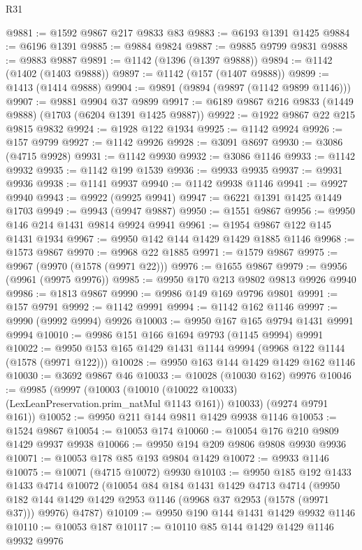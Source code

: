 \begin{lexlean}{R31}
\begin{coremodule}
@9881 := @1592 @9867 @217 @9833 @83
@9883 := @6193 @1391 @1425
@9884 := @6196 @1391
@9885 := @9884 @9824
@9887 := @9885 @9799 @9831
@9888 := @9883 @9887
@9891 := @1142 (@1396 (@1397 @9888))
@9894 := @1142 (@1402 (@1403 @9888))
@9897 := @1142 (@157 (@1407 @9888))
@9899 := @1413 (@1414 @9888)
@9904 := @9891 (@9894 (@9897 (@1142 @9899 @1146)))
@9907 := @9881 @9904 @37 @9899
@9917 := @6189 @9867 @216 @9833 (@1449 @9888) (@1703 (@6204 @1391 @1425 @9887))
@9922 := @1922 @9867 @22 @215 @9815 @9832
@9924 := @1928 @122 @1934
@9925 := @1142 @9924
@9926 := @157 @9799
@9927 := @1142 @9926
@9928 := @3091 @8697
@9930 := @3086 (@4715 @9928)
@9931 := @1142 @9930
@9932 := @3086 @1146
@9933 := @1142 @9932
@9935 := @1142 @199 @1539
@9936 := @9933 @9935
@9937 := @9931 @9936
@9938 := @1141 @9937
@9940 := @1142 @9938 @1146
@9941 := @9927 @9940
@9943 := @9922 (@9925 @9941)
@9947 := @6221 @1391 @1425 @1449 @1703
@9949 := @9943 (@9947 @9887)
@9950 := @1551 @9867
@9956 := @9950 @146 @214 @1431 @9814 @9924 @9941
@9961 := @1954 @9867 @122 @145 @1431 @1934
@9967 := @9950 @142 @144 @1429 @1429 @1885 @1146
@9968 := @1573 @9867
@9970 := @9968 @22 @1885
@9971 := @1579 @9867
@9975 := @9967 (@9970 (@1578 (@9971 @22)))
@9976 := @1655 @9867
@9979 := @9956 (@9961 (@9975 @9976))
@9985 := @9950 @170 @213 @9802 @9813 @9926 @9940
@9986 := @1813 @9867
@9990 := @9986 @149 @169 @9796 @9801
@9991 := @157 @9791
@9992 := @1142 @9991
@9994 := @1142 @162 @1146
@9997 := @9990 (@9992 @9994) @9926
@10003 := @9950 @167 @165 @9794 @1431 @9991 @9994
@10010 := @9986 @151 @166 @1694 @9793 (@1145 @9994) @9991
@10022 := @9950 @153 @165 @1429 @1431 @1144 @9994 (@9968 @122 @1144 (@1578 (@9971 @122)))
@10028 := @9950 @163 @144 @1429 @1429 @162 @1146
@10030 := @3692 @9867 @46
@10033 := @10028 (@10030 @162) @9976
@10046 := @9985
    (@9997
      (@10003 (@10010 (@10022 @10033) (LexLeanPreservation.prim_natMul @1143 @161)) @10033)
      (@9274 @9791 @161))
@10052 := @9950 @211 @144 @9811 @1429 @9938 @1146
@10053 := @1524 @9867
@10054 := @10053 @174
@10060 := @10054 @176 @210 @9809 @1429 @9937 @9938
@10066 := @9950 @194 @209 @9806 @9808 @9930 @9936
@10071 := @10053 @178 @85 @193 @9804 @1429
@10072 := @9933 @1146
@10075 := @10071 (@4715 @10072) @9930
@10103 := @9950
    @185
    @192
    @1433
    @1433
    @4714
    @10072
    (@10054
      @84
      @184
      @1431
      @1429
      @4713
      @4714
      (@9950 @182 @144 @1429 @1429 @2953 @1146 (@9968 @37 @2953 (@1578 (@9971 @37))) @9976)
      @4787)
@10109 := @9950 @190 @144 @1431 @1429 @9932 @1146
@10110 := @10053 @187
@10117 := @10110 @85 @144 @1429 @1429 @1146 @9932 @9976

\end{coremodule}
\end{lexlean}
